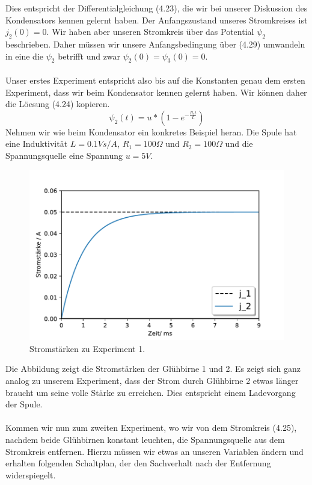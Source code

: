 \documentclass[11pt,a4paper,leqno]{report}
\numberwithin{equation}{chapter}
\begin{document}
Dies entspricht der Differentialgleichung (4.23), die wir bei unserer Diskussion des Kondensators kennen gelernt haben. Der Anfangszustand unseres Stromkreises ist $j_2(0) = 0$. Wir haben aber unseren Stromkreis \"uber das Potential $\psi_2$ beschrieben.  Daher m\"ussen wir unsere Anfangsbedingung \"uber (4.29)  umwandeln in eine die $\psi_2$ betrifft und zwar $\psi_2(0) = \psi_3(0) = 0$.\\
\\
Unser erstes Experiment entspricht also bis auf die Konstanten genau dem ersten Experiment, dass wir beim Kondensator kennen gelernt haben. Wir k\"onnen daher die L\"oesung (4.24) kopieren.
\begin{equation}
\psi_2(t) = u * (1 - e^{-\frac{R_2 t}{L}})
\end{equation}  
Nehmen wir wie beim Kondensator ein konkretes Beispiel heran. Die Spule hat eine Induktivit\"at $L=0.1 Vs/A$, $R_1=100\Omega$ und $R_2=100\Omega$ und die Spannungsquelle eine Spannung $u=5V$.
\begin{figure}[H]
	\begin{center}
		\includegraphics[scale=0.75]{spule_j.pdf}
		\caption{Stromst\"arken zu Experiment 1.}
	\end{center}
\end{figure}
\noindent
Die Abbildung zeigt die Stromst\"arken der Gl\"uhbirne 1 und 2. Es zeigt sich ganz analog zu unserem Experiment, dass der Strom durch Gl\"uhbirne 2 etwas l\"anger braucht um seine volle St\"arke zu erreichen. Dies entspricht einem Ladevorgang der Spule.\\
\\
Kommen wir nun zum zweiten Experiment, wo wir von dem Stromkreis (4.25), nachdem beide Gl\"uhbirnen konstant leuchten, die Spannungsquelle aus dem Stromkreis entfernen. Hierzu m\"ussen wir etwas an unseren Variablen \"andern und erhalten folgenden Schaltplan, der den Sachverhalt nach der Entfernung widerspiegelt.
\end{document}
